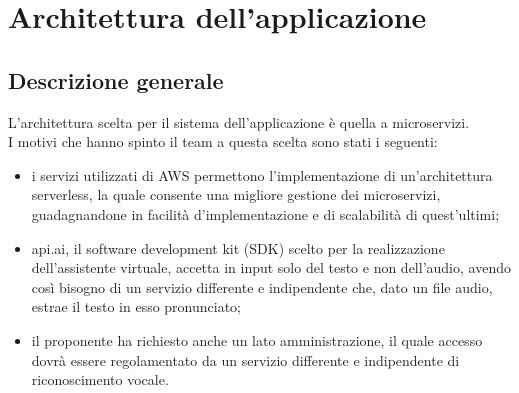 
\section{Architettura dell'applicazione}
\subsection{Descrizione generale}
L'architettura scelta per il sistema dell'applicazione è quella a microservizi.\\
I motivi che hanno spinto il team a questa scelta sono stati i seguenti:
\begin{itemize}
	\item i servizi utilizzati di AWS permettono l'implementazione di un'architettura serverless, la quale consente una migliore gestione dei microservizi, guadagnandone in facilità d'implementazione e di scalabilità di quest'ultimi;
	\item api.ai, il software development kit (SDK) scelto per la realizzazione dell'assistente virtuale, accetta in input solo del testo e non dell'audio, avendo così bisogno di un servizio differente e indipendente che, dato un file audio, estrae il testo in esso pronunciato;
	\item il proponente ha richiesto anche un lato amministrazione, il quale accesso dovrà essere regolamentato da un servizio differente e indipendente di riconoscimento vocale.
\end{itemize}

